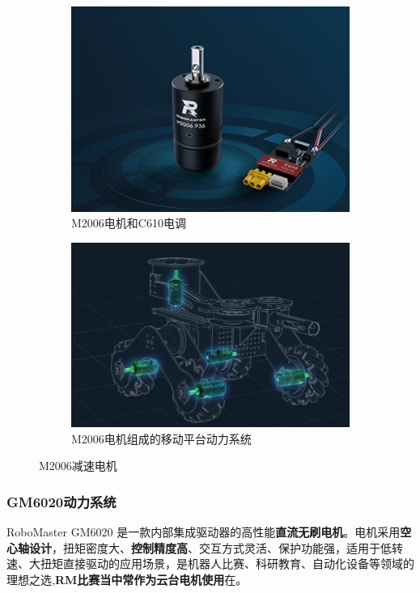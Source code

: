 \documentclass[UTF8]{article} %
\begin{document}
\begin{figure}[H]
  \centering
  \begin{subfigure}[b]{0.35\textwidth}
         \centering
         \includegraphics[width=\textwidth]{dj5.png}
          \caption{M2006电机和C610电调}
  \end{subfigure}
  \quad
  \begin{subfigure}[b]{0.39\textwidth}
          \centering
          \includegraphics[width=\textwidth]{dj6.png}
          \caption{M2006电机组成的移动平台动力系统}
  \end{subfigure}
  \caption{M2006减速电机}
\end{figure}

\subsubsection{GM6020动力系统}
RoboMaster GM6020 是一款内部集成驱动器的高性能\textbf{直流无刷电机}。电机采用\textbf{空心轴设计}，扭矩密度大、\textbf{控制精度高}、交互方式灵活、保护功能强，适用于低转速、大扭矩直接驱动的应用场景，是机器人比赛、科研教育、自动化设备等领域的理想之选,\textbf{RM比赛当中常作为云台电机使用}在。
\end{document}
